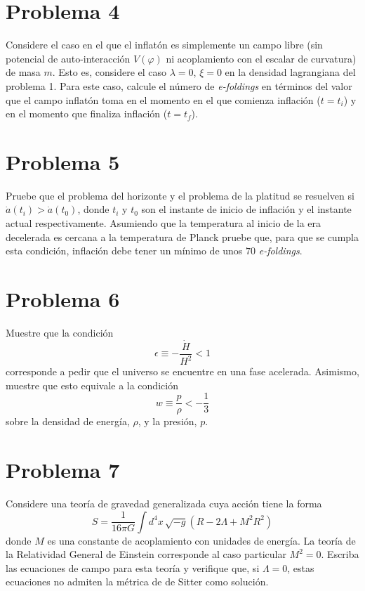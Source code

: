 \documentclass[11pt,a4paper]{article}
\begin{document}
\section*{Problema 4}
Considere el caso en el que el inflatón es simplemente un campo libre (sin potencial de auto-interacción $V(\varphi)$ ni acoplamiento con el escalar de curvatura) de masa $m$. Esto es, considere el caso $\lambda=0$, $\xi=0$ en la densidad lagrangiana del problema 1. Para este caso, calcule el número de \emph{e-foldings} en términos del valor que el campo inflatón toma en el momento en el que comienza inflación ($t=t_i$) y en el momento que finaliza inflación ($t=t_f$).

\section*{Problema 5}
Pruebe que el problema del horizonte y el problema de la platitud se resuelven si $\dot a(t_i)>\dot a(t_0)$, donde $t_i$ y $t_0$ son el instante de inicio de inflación y el instante actual respectivamente. Asumiendo que la temperatura al inicio de la era decelerada es cercana a la temperatura de Planck pruebe que, para que se cumpla esta condición, inflación debe tener un mínimo de unos $70$ \emph{e-foldings}.

\section*{Problema 6}
Muestre que la condición
\begin{equation}
  \epsilon\equiv-\frac{\dot H}{H^2}<1
\end{equation}
corresponde a pedir que el universo se encuentre en una fase acelerada. Asimismo, muestre que esto equivale a la condición
\begin{equation}
  w\equiv\frac{p}{\rho}<-\frac13
\end{equation}
sobre la densidad de energía, $\rho$, y la presión, $p$.

\section*{Problema 7}
Considere una teoría de gravedad generalizada cuya acción tiene la forma
\begin{equation}
  S=\frac{1}{16\pi G}\int d^4x\,\sqrt{-g}\left(R-2\Lambda+M^2R^2\right)
\end{equation}
donde $M$ es una constante de acoplamiento con unidades de energía. La teoría de la Relatividad General de Einstein corresponde al caso particular $M^2=0$. Escriba las ecuaciones de campo para esta teoría y verifique que, si $\Lambda=0$, estas ecuaciones no admiten la métrica de de Sitter como solución.
\end{document}
